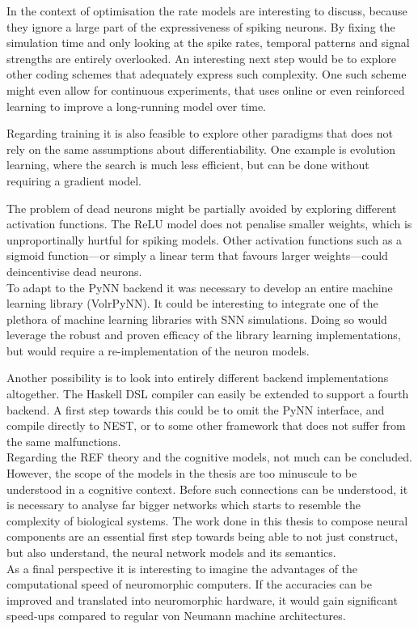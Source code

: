 \documentclass[report.tex]{subfiles}
\begin{document}
In the context of optimisation the rate models are interesting to discuss,
because they ignore a large part of the expressiveness of spiking neurons.
By fixing the simulation time and only looking at the spike rates,
temporal patterns and signal strengths are entirely overlooked.
An interesting next step would be to explore other coding schemes that
adequately express such complexity. 
One such scheme might even allow for continuous experiments, that uses online or
even reinforced learning to improve a long-running model over time.

Regarding training it is also feasible to explore other paradigms that does not
rely on the same assumptions about differentiability. 
One example is evolution learning, where the search is much less efficient, but
can be done without requiring a gradient model.

The problem of dead neurons might be partially avoided by exploring different
activation functions. 
The ReLU model does not penalise smaller weights, which is
unproportinally hurtful for spiking models.
Other activation functions such as a sigmoid function---or simply a linear term
that favours larger weights---could deincentivise dead neurons.
\\[0.1cm]

To adapt to the PyNN backend it was necessary to develop an entire machine
learning library (VolrPyNN). 
It could be interesting to integrate one of the plethora of machine
learning libraries with \gls{SNN} simulations.
Doing so would leverage the robust and proven efficacy of the library learning
implementations, but would require a re-implementation of the neuron models.

Another possibility is to look into entirely different backend implementations
altogether.
The Haskell \gls{DSL} compiler can easily be extended to support a fourth
backend.
A first step towards this could be to omit the PyNN interface, and compile
directly to NEST, or to some other framework that does not suffer from the same
malfunctions.
\\[0.1cm]

Regarding the REF theory and the cognitive models, not much can be concluded.
However, the scope of the models in the thesis are too minuscule to be understood
in a cognitive context.
Before such connections can be understood, it is necessary to analyse far bigger
networks which starts to resemble the complexity of biological systems.
The work done in this thesis to compose neural components are an essential first
step towards being able to not just construct, but also understand, the neural
network models and its semantics.
\\[0.1cm]

As a final perspective it is interesting to imagine the advantages of the
computational speed of neuromorphic computers.
If the accuracies can be improved and translated into neuromorphic hardware, it
would gain significant speed-ups compared to regular von Neumann machine
architectures.

\FloatBarrier
\end{document}
